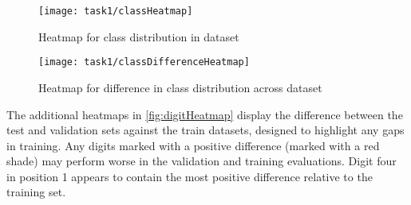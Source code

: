\begin{figure}[h]
    \centering
    \texttt{[image: task1/classHeatmap]}
    \caption[Heatmap for class distribution in dataset]
    {Heatmap for class distribution in dataset}
    \label{fig:heatmap}
\end{figure}

\begin{figure}[h]
    \centering
    \texttt{[image: task1/classDifferenceHeatmap]}
    \caption[Heatmap for difference in class distribution across dataset]
    {Heatmap for difference in class distribution across dataset}
    \label{fig:digitHeatmap}
\end{figure}

The additional heatmaps in \autoref{fig:digitHeatmap} display the difference between the test and validation sets against the train datasets, designed to highlight any gaps in training. Any digits marked with a positive difference (marked with a red shade) may perform worse in the validation and training evaluations. Digit four in position 1 appears to contain the most positive difference relative to the training set.